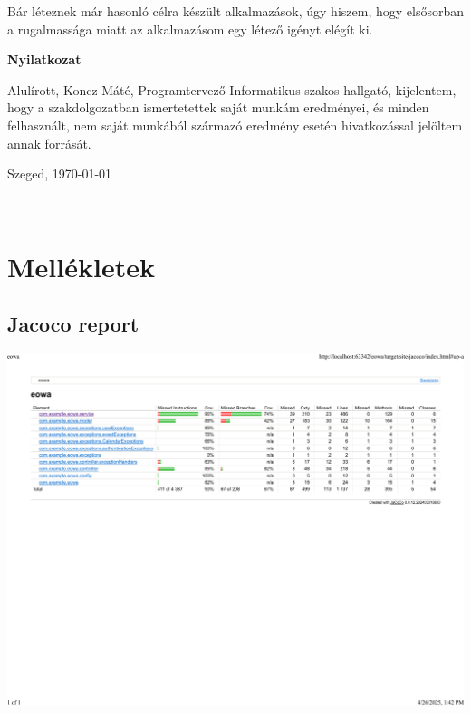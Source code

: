 \documentclass[a4paper,12pt]{report}
\theoremstyle{definition}
\theoremstyle{remark}
\begin{document}
Bár léteznek már hasonló célra készült alkalmazások, úgy hiszem, hogy elsősorban a rugalmassága miatt az alkalmazásom egy létező igényt elégít ki.

\newpage


 

\newpage
{\Huge \bf Nyilatkozat}


\vspace{2 cm}

Alulírott, Koncz Máté, Programtervező Informatikus szakos hallgató, kijelentem, hogy a szakdolgozatban ismertetettek saját munkám eredményei, és minden felhasznált, nem saját munkából származó eredmény esetén hivatkozással jelöltem annak forrását. 


\begin{flushleft}
\vspace*{1cm}
Szeged, \today
\end{flushleft}

\begin{flushright}
 \vspace*{1cm}
 \makebox[7cm]{\rule{6cm}{.4pt}}\\
\end{flushright}

\pagebreak

\newpage
\section*{Mellékletek}


\subsection{Jacoco report}
\label{jacoco}
\begin{center}
\includegraphics[width=170mm]{jacoco.pdf}

\end{center}
\end{document}
